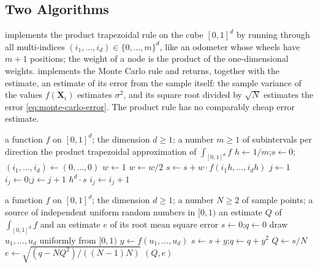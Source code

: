 \subsection{Two Algorithms}

 implements the product trapezoidal rule on the cube $[0,1]^d$ by running through all multi-indices $(i_1,\ldots,i_d)\in\{0,\ldots,m\}^d$, like an odometer whose wheels have $m+1$ positions; the weight of a node is the product of the one-dimensional weights.  implements the Monte Carlo rule and returns, together with the estimate, an estimate of its error from the sample itself: the sample variance of the values $f(\mathbf X_i)$ estimates $\sigma^2$, and its square root divided by $\sqrt N$ estimates the error \eqref{eq:monte-carlo-error}. The product rule has no comparably cheap error estimate.

\begin{algorithm}
\begin{algorithmic}[1]
\Require a function $f$ on $[0,1]^d$; the dimension $d\ge1$; a number $m\ge1$ of subintervals per direction
\Ensure the product trapezoidal approximation of $\int_{[0,1]^d}f$
\State $h\gets1/m$;\quad $s\gets0$;\quad $(i_1,\ldots,i_d)\gets(0,\ldots,0)$
\Loop
  \State $w\gets1$
     $w\gets w/2$ 
    \EndIf
  \EndFor
  \State $s\gets s+w\cdot f(i_1h,\ldots,i_dh)$
  \State $j\gets1$ 
    \State $i_j\gets0$;\quad $j\gets j+1$
  \EndWhile
   \Return $h^d\cdot s$ 
  \EndIf
  \State $i_j\gets i_j+1$
\EndLoop
\end{algorithmic}
\caption{The product trapezoidal rule on the unit cube. The loop body runs $(m+1)^d$ times.}
\label{alg:product-trapezoid}
\end{algorithm}

\begin{algorithm}
\begin{algorithmic}[1]
\Require a function $f$ on $[0,1]^d$; the dimension $d\ge1$; a number $N\ge2$ of sample points; a source of independent uniform random numbers in $[0,1)$
\Ensure an estimate $Q$ of $\int_{[0,1]^d}f$ and an estimate $e$ of its root mean square error
\State $s\gets0$;\quad $q\gets0$
  \State draw $u_1,\ldots,u_d$ uniformly from $[0,1)$
  \State $y\gets f(u_1,\ldots,u_d)$
  \State $s\gets s+y$;\quad $q\gets q+y^2$
\EndFor
\State $Q\gets s/N$
\State $e\gets\sqrt{(q-NQ^2)/((N-1)N)}$ 
\State \Return $(Q,e)$
\end{algorithmic}
\caption{Monte Carlo integration over the unit cube. The cost is $N$ evaluations of $f$ whatever the dimension. Accumulating $q$ as a sum of squares can lose accuracy when the mean is large compared with the spread; Volume~VI discusses stable updating formulas.}
\label{alg:monte-carlo}
\end{algorithm}

